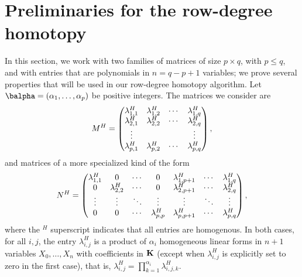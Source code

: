 \documentclass[12pt]{article}
\begin{document}


\section{Preliminaries for the row-degree homotopy}

In this section, we work with two families of matrices of size $p
\times q$, with $p \le q$, and with entries that are polynomials in
$n=q-p+1$ variables; we prove several properties that will be used 
in our row-degree homotopy algorithm. Let $\balpha=(\alpha_1,\dots,\alpha_p)$
be positive integers. The matrices we consider are
\begin{align}\label{eqdef:type2}
{M}^H= \left( \begin{matrix}
\lambda^H_{1,1} & \lambda^H_{1,2} & \cdots & \lambda^H_{1, q}\\
 \lambda^H_{2,1} &  \lambda^H_{2,2} & \cdots & \lambda^H_{2, q}\\
 \vdots & & & \vdots\\
 \lambda^H_{p,1} &  \lambda^H_{p,2}& \cdots & \lambda^H_{p, q}
\end{matrix} \right),
\end{align}
and matrices of a more specialized kind of the form
\begin{align}\label{eqdef:type1}
{N}^H= \left( \begin{matrix}
\lambda^H_{1,1} & 0 & \cdots & 0 & \lambda^H_{1,p+1} & \cdots & \lambda^H_{1, q}\\
0 & \lambda^H_{2,2} & \cdots & 0 & \lambda^H_{2,p+1} & \cdots & \lambda^H_{2, q}\\
\vdots & \vdots & \ddots & \vdots & \vdots & \ddots & \vdots\\
0 & 0 & \cdots & \lambda^H_{p,p} & \lambda^H_{p,p+1} & \cdots & \lambda^H_{p, q}
\end{matrix} \right),
\end{align}
where the ${}^H$ superscript indicates that all entries are
homogenous.  In both cases, for all $i,j$, the entry $\lambda^H_{i,j}$
is a product of $\alpha_i$ homogeneous linear forms in $n+1$ variables
$X_0,\dots,X_n$ with coefficients in $\mathbf{K}$ (except when
$\lambda^H_{i,j}$ is explicitly set to zero in the first case), that
is, $\lambda^H_{i,j}=\prod_{k=1}^{\alpha_i} \lambda^H_{i,j,k}$.  
\end{document}
